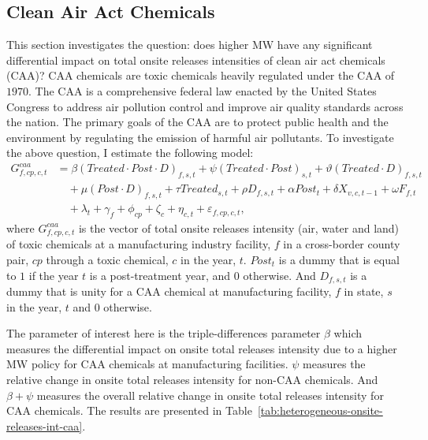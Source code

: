 \documentclass[12pt, english]{article}
\begin{document}
    \subsection{Clean Air Act Chemicals}\label{subsec:clean-air-act-chemicals}
    This section investigates the question: does higher MW have any significant differential impact on total onsite releases intensities of clean air act chemicals (CAA)? CAA chemicals are toxic chemicals heavily regulated under the CAA of $1970$. The CAA is a comprehensive federal law enacted by the United States Congress to address air pollution control and improve air quality standards across the nation. The primary goals of the CAA are to protect public health and the environment by regulating the emission of harmful air pollutants. To investigate the above question, I estimate the following model:
    \begin{align}
        G_{f,cp,c,t}^{caa} &= \beta (Treated \cdot Post \cdot D)_{f,s,t} + \psi (Treated \cdot Post)_{s,t} + \vartheta (Treated \cdot D)_{f,s,t} \nonumber \\
        &\quad + \mu (Post \cdot D)_{f,s,t} + \tau Treated_{s,t} + \rho D_{f,s,t} + \alpha Post_{t} + \delta X_{v,c,t-1} + \omega F_{f,t} \nonumber \\
        &\quad + \lambda_{t} + \gamma_{f} + \phi_{cp} + \zeta_{c} + \eta_{c,t} + \varepsilon_{f,cp,c,t},\label{eq:heterogeneous-onsite-releases-intensity-caa}
    \end{align}
    where $G_{f,cp,c,t}^{caa}$ is the vector of total onsite releases intensity (air, water and land) of toxic chemicals at a manufacturing industry facility, $f$ in a cross-border county pair, $cp$ through a toxic chemical, $c$ in the year, $t$. $Post_{t}$ is a dummy that is equal to $1$ if the year $t$ is a post-treatment year, and $0$ otherwise. And $D_{f,s,t}$ is a dummy that is unity for a CAA chemical at manufacturing facility, $f$ in state, $s$ in the year, $t$ and $0$ otherwise.
    

    The parameter of interest here is the triple-differences parameter $\beta$ which measures the differential impact on onsite total releases intensity due to a higher MW policy for CAA chemicals at manufacturing facilities. $\psi$ measures the relative change in onsite total releases intensity for non-CAA chemicals. And $\beta + \psi$ measures the overall relative change in onsite total releases intensity for CAA chemicals. The results are presented in Table~\ref{tab:heterogeneous-onsite-releases-int-caa}.
    
\end{document}
